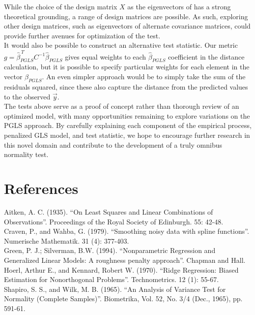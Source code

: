 \documentclass[12pt]{article}
\begin{document}
While the choice of the design matrix $X$ as the eigenvectors of  has a strong theoretical grounding, a range of design matrices are possible. As such, exploring other design matrices, such as eigenvectors of alternate covariance matrices, could provide further avenues for optimization of the test.\\

It would also be possible to construct an alternative test statistic. Our metric $g=\hat{\beta}_{PGLS}^{\, T}C^{-1}\hat{\beta}_{PGLS}$ gives equal weights to each $\hat{\beta}_{PGLS}$ coefficient in the distance calculation, but it is possible to specify particular weights for each element in the vector $\hat{\beta}_{PGLS}$. An even simpler approach would be to simply take the sum of the residuals squared, since these also capture the distance from the predicted values to the observed $\vec{y}$.\\

The tests above serve as a proof of concept rather than thorough review of an optimized model, with many opportunities remaining to explore variations on the PGLS approach. By carefully explaining each component of the empirical process, penalized GLS model, and test statistic, we hope to encourage further research in this novel domain and contribute to the development of a truly omnibus normality test.

\section{References}

Aitken, A. C. (1935). ``On Least Squares and Linear Combinations of Observations''. Proceedings of the Royal Society of Edinburgh. 55: 42-48.\\

Craven, P., and Wahba, G. (1979). ``Smoothing noisy data with spline functions''. Numerische Mathematik. 31 (4): 377-403.\\

Green, P. J.; Silverman, B.W. (1994). ``Nonparametric Regression and Generalized Linear Models: A roughness penalty approach''. Chapman and Hall.\\

Hoerl, Arthur E., and Kennard, Robert W. (1970). ``Ridge Regression: Biased Estimation for Nonorthogonal Problems''. Technometrics. 12 (1): 55-67.\\

Shapiro, S. S., and Wilk, M. B. (1965). ``An Analysis of Variance Test for Normality (Complete Samples)''. Biometrika, Vol. 52, No. 3/4 (Dec., 1965), pp. 591-61.\\
\end{document}
